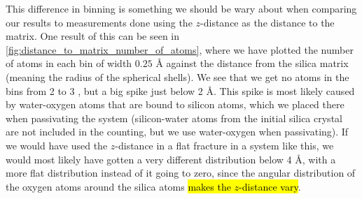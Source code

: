 This difference in binning is something we should be wary about when comparing our results to measurements done using the $z$-distance as the distance to the matrix. One result of this can be seen in \cref{fig:distance_to_matrix_number_of_atoms}, where we have plotted the number of atoms in each bin of width $0.25\text{ \AA}$ against the distance from the silica matrix (meaning the radius of the spherical shells). We see that we get no atoms in the bins from 2 to 3 \Ang, but a big spike just below 2 \AA. This spike is most likely caused by water-oxygen atoms that are bound to silicon atoms, which we placed there when passivating the system (silicon-water atoms from the initial silica crystal are not included in the counting, but we use water-oxygen when passivating). If we would have used the $z$-distance in a flat fracture in a system like this, we would most likely have gotten a very different distribution below 4 \AA{}, with a more flat distribution instead of it going to zero, since the angular distribution of the oxygen atoms around the silica atoms \hl{makes the $z$-distance vary}.
%
%
